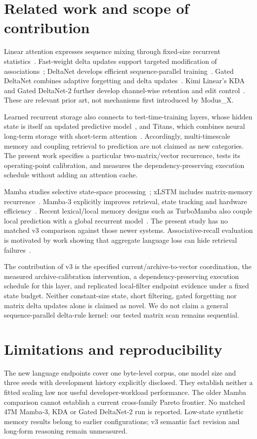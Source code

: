 \documentclass[10pt]{article}
\newcommand{\mx}{Modus\_X}
\begin{document}
\section{Related work and scope of contribution}
Linear attention expresses sequence mixing through fixed-size recurrent
statistics~\cite{katharopoulos2020}. Fast-weight delta updates support targeted
modification of associations~\cite{schlag2021}; DeltaNet develops efficient
sequence-parallel training~\cite{yang2024delta}. Gated DeltaNet combines adaptive
forgetting and delta updates~\cite{yang2024gated}. Kimi Linear's KDA and
Gated DeltaNet-2 further develop channel-wise retention and edit
control~\cite{kimi2025,hatamizadeh2026}. These are relevant prior art, not
mechanisms first introduced by \mx.

Learned recurrent storage also connects to test-time-training layers, whose
hidden state is itself an updated predictive model~\cite{sun2024}, and Titans,
which combines neural long-term storage with short-term attention~\cite{behrouz2025}.
Accordingly, multi-timescale memory and coupling retrieval to prediction are
not claimed as new categories. The present work specifies a particular
two-matrix/vector recurrence, tests its operating-point calibration, and measures
the dependency-preserving execution schedule without adding an attention cache.

Mamba studies selective state-space processing~\cite{gu2023}; xLSTM includes
matrix-memory recurrence~\cite{beck2024}. Mamba-3 explicitly improves retrieval,
state tracking and hardware efficiency~\cite{lahoti2026}. Recent lexical/local
memory designs such as TurboMamba also couple local prediction with a global
recurrent model~\cite{zhang2026}. The present study has no matched v3 comparison
against those newer systems. Associative-recall evaluation is motivated by work
showing that aggregate language loss can hide retrieval failures~\cite{arora2023}.

The contribution of v3 is the specified current/archive-to-vector coordination,
the measured archive-calibration intervention, a dependency-preserving execution
schedule for this layer, and replicated local-filter endpoint evidence under a
fixed state budget. Neither constant-size state, short filtering, gated forgetting
nor matrix delta updates alone is claimed as novel. We do not claim a general
sequence-parallel delta-rule kernel: our tested matrix scan remains sequential.

\section{Limitations and reproducibility}
The new language endpoints cover one byte-level corpus, one model size and
three seeds with development history explicitly disclosed. They establish neither
a fitted scaling law nor useful developer-workload performance. The older Mamba
comparison cannot establish a current cross-family Pareto frontier. No matched
47M Mamba-3, KDA or Gated DeltaNet-2 run is reported. Low-state synthetic memory
results belong to earlier configurations; v3 semantic fact revision and long-form
reasoning remain unmeasured.
\end{document}
